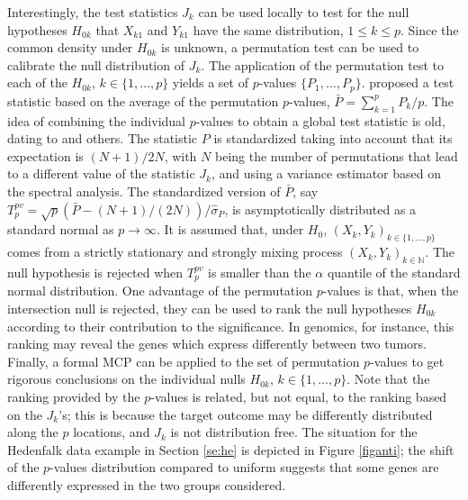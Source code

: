 Interestingly, the test statistics $J_k$ can be used locally to test for the null
hypotheses $H_{0k}$ that $X_{k1}$ and $Y_{k1}$ have the same
distribution, $1\leq k\leq p$. Since the  common density under $H_{0k}$ is unknown, a permutation test can be used to calibrate the null distribution of $J_k$. The application of the permutation test to each of the $H_{0k}$, $k\in\{1,\ldots, p\}$ yields a set of $p$-values $\{P_1,
\ldots, P_p\}$. \cite{Marta2} proposed a test statistic based on the average of the permutation $p$-values, $\bar P=\sum_{k=1}^{p}
P_k/p$.  The idea of combining  the individual
$p$-values to obtain a global test statistic is old, dating
to \cite{Fisher,stou} and others. The statistic $P$ is standardized taking into account that its expectation is ${(N+1)}/{2N}$, with $N$ being the number of permutations that lead to a different value of the statistic $J_k$, and using a variance estimator based on the spectral analysis. 
The standardized version of $\bar P$, say $T_p^{pv}={\sqrt{p}\left(\bar 
	P-(N+1)/(2N)\right)}/{\widehat{\sigma}_{P}}$, is asymptotically distributed as a standard normal as $p \rightarrow \infty$. It is assumed that, under $H_0$,  $(X_k,Y_k)_{k \in \{1, \dots, p\}}$ comes from a strictly stationary and  strongly mixing 
process  $(X_k,Y_k)_{k\in\mathbb{N}}$. The null hypothesis is rejected when $T_p^{pv}$ is smaller than the $\alpha$
quantile of the standard normal distribution. One advantage of the permutation $p$-values is that, when the intersection null is rejected, they can be used to rank
the null hypotheses $H_{0k}$ according to their contribution to the
significance. In genomics, for instance, this ranking may reveal the genes which express differently 
between two tumors. 
Finally, a formal MCP can be applied to the set of permutation $p$-values to get rigorous conclusions
on the individual nulls $H_{0k}$, $k\in\{1,\ldots, p\}$. {Note that the ranking provided by the $p$-values is related, but not equal, to the ranking based on the $J_k$'s; this is because the target outcome may be differently distributed along the $p$ locations, and $J_k$ is not distribution free. The situation for the Hedenfalk data example in Section \ref{se:he} is depicted in Figure \ref{figanti}; the shift of the $p$-values distribution compared to uniform suggests that some genes are differently expressed in the two groups considered.}


